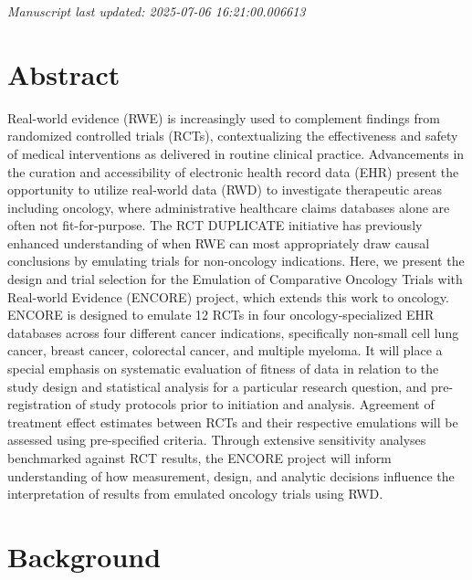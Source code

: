 \documentclass[
  letterpaper,
  DIV=11,
  numbers=noendperiod]{scrartcl}
\begin{document}
\emph{Manuscript last updated: 2025-07-06 16:21:00.006613}

\newpage{}

\section*{Abstract}\label{abstract}

Real-world evidence (RWE) is increasingly used to complement findings
from randomized controlled trials (RCTs), contextualizing the
effectiveness and safety of medical interventions as delivered in
routine clinical practice. Advancements in the curation and
accessibility of electronic health record data (EHR) present the
opportunity to utilize real-world data (RWD) to investigate therapeutic
areas including oncology, where administrative healthcare claims
databases alone are often not fit-for-purpose. The RCT DUPLICATE
initiative has previously enhanced understanding of when RWE can most
appropriately draw causal conclusions by emulating trials for
non-oncology indications. Here, we present the design and trial
selection for the Emulation of Comparative Oncology Trials with
Real-world Evidence (ENCORE) project, which extends this work to
oncology. ENCORE is designed to emulate 12 RCTs in four
oncology-specialized EHR databases across four different cancer
indications, specifically non-small cell lung cancer, breast cancer,
colorectal cancer, and multiple myeloma. It will place a special
emphasis on systematic evaluation of fitness of data in relation to the
study design and statistical analysis for a particular research
question, and pre-registration of study protocols prior to initiation
and analysis. Agreement of treatment effect estimates between RCTs and
their respective emulations will be assessed using pre-specified
criteria. Through extensive sensitivity analyses benchmarked against RCT
results, the ENCORE project will inform understanding of how
measurement, design, and analytic decisions influence the interpretation
of results from emulated oncology trials using RWD.

\newpage{}

\section{Background}\label{background}
\end{document}
